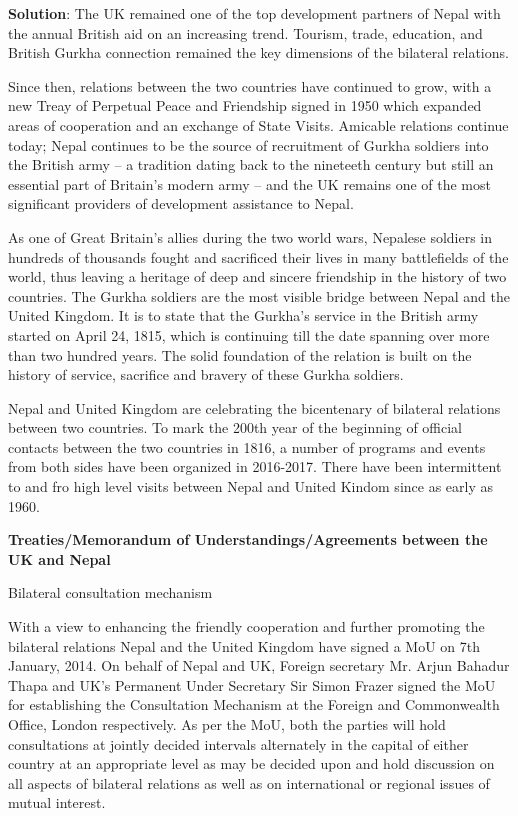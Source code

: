 \documentclass[
  openany]{book}
\newenvironment{solution}{ {\bfseries Solution}:}{}
\begin{document}
\begin{questions}
\begin{solution}
The UK remained one of the top development partners of Nepal with the annual British aid on an increasing trend. Tourism, trade, education, and British Gurkha connection remained the key dimensions of the bilateral relations.

Since then, relations between the two countries have continued to grow, with a new Treay of Perpetual Peace and Friendship signed in 1950 which expanded areas of cooperation and an exchange of State Visits. Amicable relations continue today; Nepal continues to be the source of recruitment of Gurkha soldiers into the British army -- a tradition dating back to the nineteeth century but still an essential part of Britain's modern army -- and the UK remains one of the most significant providers of development assistance to Nepal.

As one of Great Britain's allies during the two world wars, Nepalese soldiers in hundreds of thousands fought and sacrificed their lives in many battlefields of the world, thus leaving a heritage of deep and sincere friendship in the history of two countries. The Gurkha soldiers are the most visible bridge between Nepal and the United Kingdom. It is to state that the Gurkha's service in the British army started on April 24, 1815, which is continuing till the date spanning over more than two hundred years. The solid foundation of the relation is built on the history of service, sacrifice and bravery of these Gurkha soldiers.

Nepal and United Kingdom are celebrating the bicentenary of bilateral relations between two countries. To mark the 200th year of the beginning of official contacts between the two countries in 1816, a number of programs and events from both sides have been organized in 2016-2017. There have been intermittent to and fro high level visits between Nepal and United Kindom since as early as 1960.

\textbf{Treaties/Memorandum of Understandings/Agreements between the UK and Nepal}

Bilateral consultation mechanism

With a view to enhancing the friendly cooperation and further promoting the bilateral relations Nepal and the United Kingdom have signed a MoU on 7th January, 2014. On behalf of Nepal and UK, Foreign secretary Mr. Arjun Bahadur Thapa and UK's Permanent Under Secretary Sir Simon Frazer signed the MoU for establishing the Consultation Mechanism at the Foreign and Commonwealth Office, London respectively. As per the MoU, both the parties will hold consultations at jointly decided intervals alternately in the capital of either country at an appropriate level as may be decided upon and hold discussion on all aspects of bilateral relations as well as on international or regional issues of mutual interest.


\end{solution}
\end{questions}
\end{document}
